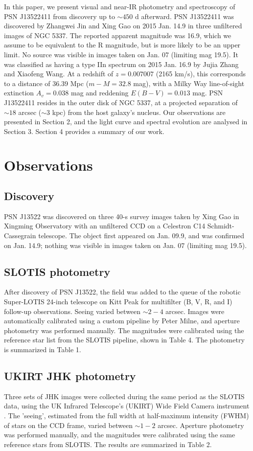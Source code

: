 \documentclass[iop]{emulateapj}
\begin{document}
In this paper, we present visual and near-IR photometry and spectroscopy of PSN J13522411 from discovery up to $\sim450$ d afterward. PSN J13522411 was discovered by Zhangwei Jin and Xing Gao on 2015 Jan. 14.9 in three unfiltered images of NGC 5337. The reported apparent magnitude was 16.9, which we assume to be equivalent to the R magnitude, but is more likely to be an upper limit. No source was visible in images taken on Jan. 07 (limiting mag 19.5). It was classified as having a type IIn spectrum on 2015 Jan. 16.9 by Jujia Zhang and Xiaofeng Wang. At a redshift of $z = 0.007007$ (2165 km/s), this corresponds to a distance of 36.39 Mpc ($m - M = 32.8$ mag), with a Milky Way line-of-sight extinction $A_v = 0.038$ mag and reddening $E(B - V) = 0.013$ mag. PSN J13522411 resides in the outer disk of NGC 5337, at a projected separation of $\sim18$ arcsec ($\sim3$ kpc) from the host galaxy's nucleus. Our observations are presented in Section 2, and the light curve and spectral evolution are analysed in Section 3. Section 4 provides a summary of our work.

\section{Observations}
\subsection{Discovery}
PSN J13522 was discovered on three 40-s survey images taken by Xing Gao in Xingming Observatory with an unfiltered CCD on a Celestron C14 Schmidt-Cassegrain telescope. The object first appeared on Jan. 09.9, and was confirmed on Jan. 14.9; nothing was visible in images taken on Jan. 07 (limiting mag 19.5).

\subsection{SLOTIS photometry}
After discovery of PSN J13522, the field was added to the queue of the robotic Super-LOTIS 24-inch telescope \citep[SLOTIS;][]{Wil08} on Kitt Peak for multifilter (B, V, R, and I) follow-up observations. Seeing varied between $\sim2-4$ arcsec. Images were automatically calibrated using a custom pipeline by Peter Milne, and aperture photometry was performed manually. The magnitudes were calibrated using the reference star list from the SLOTIS pipeline, shown in Table 4. The photometry is summarized in Table 1.

\subsection{UKIRT JHK photometry}
Three sets of JHK images were collected during the same period as the SLOTIS data, using the UK Infrared Telescope's (UKIRT) Wide Field Camera instrument \citep[WFCAM;][]{Hod09}. The 'seeing', estimated from the full width at half-maximum intensity (FWHM) of stars on the CCD frame, varied between $\sim1-2$ arcsec. Aperture photometry was performed manually, and the magnitudes were calibrated using the same reference stars from SLOTIS. The results are summarized in Table 2.
\end{document}
